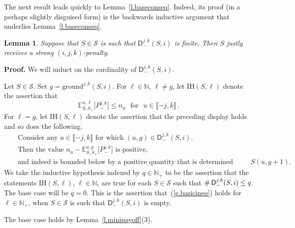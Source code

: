 \documentclass[letterpaper,11pt,oneside,reqno]{amsbook}
\newcommand{\N}{\ensuremath{\mathbb{N}}}
\newcommand{\E}[0]{\mathbb{E}}
\numberwithin{figure}{chapter}
\newtheorem{lemma}[theorem]{Lemma}
\theoremstyle{definition}
\theoremstyle{definition}
\theoremstyle{definition}
\theoremstyle{definition}
\theoremstyle{definition}
\newcommand{\mc}{\mathcal}
\newcommand{\nwithzero}{\N}
\newcommand{\nwithoutzero}{\N_+}
\newcommand{\ground}{\textrm{ground}}
\newcommand{\indhyp}{\textrm{IH}}
\begin{document}
The next result leads quickly to Lemma~\ref{l.baseconseq}. Indeed, its proof (in a perhaps slightly disguised form) is the backwards inductive argument that underlies Lemma~\ref{l.baseconseq}.
\begin{lemma}\label{l.backwardformal}
Suppose that $S \in \mc{S}$ is such that 
$\mathsf{D}_-^{j,k}(S,i)$ is finite. Then $S$ justly receives a strong $(i,j,k)$-penalty. 
\end{lemma}
{\bf Proof.}
We will induct on the cardinality of $\mathsf{D}_-^{j,k}(S,i)$. 

Let $S \in \mc{S}$. Set $g =  \ground^{j,k}(S,i)$.
 For $\ell \in \nwithzero$, $\ell \not= g$, let $\indhyp(S,\ell)$
denote the assertion that
\begin{equation}\label{e.basicineq}
\E^{u,\ell}_{S,S_+} \big[ P^{j,k}_- \big] \leq n_u \, \, \, \, \textrm{for} \, \, \, \, u \in \llbracket -j,k \rrbracket \, .
\end{equation}
For $\ell =g$, let $\indhyp(S,\ell)$ denote the assertion that the preceding display holds and so does the following.
\begin{eqnarray*}
 & & \textrm{Consider any $u \in \llbracket -j,k \rrbracket$ for which $(u,g) \in \mathsf{D}_-^{j,k}(S,i)$.}\\
 & & \textrm{Then  the value $n_u -  \E^{u,g}_{S,S_+} \big[ P^{j,k}_- \big]$ is positive,} \\
 & & \textrm{and indeed is bounded below by a positive quantity that is determined solely by $S(u,g+1)$.}
 \end{eqnarray*}
We take the inductive hypothesis indexed by $q \in \nwithoutzero$ to be the assertion that the statements  $\indhyp(S,\ell)$, $\ell \in \nwithzero$, are true for each 
$S \in \mc{S}$ such that  $\char"0023 \,  \mathsf{D}_-^{j,k}(S,i) \leq q$.
The base case will be $q = 0$. This is the assertion that~(\ref{e.basicineq}) holds for $\ell \in \nwithoutzero$, when $S \in \mc{S}$
is such that  $\mathsf{D}_-^{j,k}(S,i)$ is empty.

The base case holds by Lemma~\ref{l.minipayoff}(3).

\end{document}
